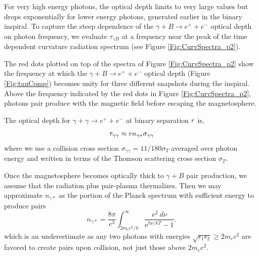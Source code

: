 For very high energy photons, the optical depth limits to very large
values but drops exponentially for lower energy photons, generated
earlier in the binary inspiral. To capture the steep dependence of the
$\gamma + B \rightarrow e^{+} + e^{-}$ optical depth on photon
frequency, we evaluate $\tau_{\gamma B}$ at a frequency near the peak
of the time dependent curvature radiation spectrum (see Figure
\ref{Fig:CurvSpectra_p2}).

The red dots plotted on top of the spectra of Figure
\ref{Fig:CurvSpectra_p2} show the frequency at which the $\gamma + B
\rightarrow e^{+} + e^{-}$ optical depth (Figure \ref{Fig:tauComp})
becomes unity for three different snapshots during the inspiral. Above
the frequency indicated by the red dots in Figure
\ref{Fig:CurvSpectra_p2}, photons pair produce with the magnetic field
before escaping the magnetosphere.



The optical depth for $\gamma + \gamma \rightarrow e^{+} + e^{-}$ at
binary separation $r$ is,
\begin{equation}
\label{GGoptd}
\tau_{\gamma \gamma} \approx r n_{\gamma*} \sigma_{\gamma \gamma}
\end{equation}
where we use a collision cross section $\sigma_{\gamma \gamma} =
11/180 \sigma_T$ \citep{LithSari:2001, Sven:1987} averaged over photon
energy and written in terms of the Thomson scattering cross section
$\sigma_T$.


Once the magnetosphere becomes optically thick to $\gamma + B$ pair
production, we assume that the radiation plus pair-plasma thermalizes.
Then we may approximate $n_{\gamma*}$ as the portion of the Planck
spectrum with sufficient energy to produce pairs
\begin{equation}
\label{nstar}
n_{\gamma*} = \frac{8 \pi }{c^3} \int^{\infty}_{2 m_e c^2/h}{\frac{
    \nu^2 \ d\nu}{ \mbox{e}^{h \nu /kT} -1 } } .
\end{equation}
which is an underestimate as any two photons with energies
$\sqrt{\epsilon_1 \epsilon_2} \geq 2 m_e c^2$ are favored to create
pairs upon collision, not just those above $2m_e c^2$.

